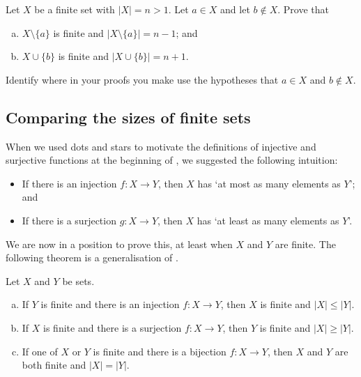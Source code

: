 \begin{exercise}
\label{exAddRemoveElementsOfFiniteSets}
Let $X$ be a finite set with $|X| = n > 1$. Let $a \in X$ and let $b \not \in X$. Prove that
\begin{enumerate}[(a)]
\item $X \setminus \{ a \}$ is finite and $|X \setminus \{ a \}| = n-1$; and
\item $X \cup \{ b \}$ is finite and $|X \cup \{ b \}| = n+1$.
\end{enumerate}
Identify where in your proofs you make use the hypotheses that $a \in X$ and $b \not \in X$.
\end{exercise}

\subsection*{Comparing the sizes of finite sets}

When we used dots and stars to motivate the definitions of injective and surjective functions at the beginning of , we suggested the following intuition:
\begin{itemize} 
\item If there is an injection $f : X \to Y$, then $X$ has `at most as many elements as $Y$'; and
\item If there is a surjection $g : X \to Y$, then $X$ has `at least as many elements as $Y$'.
\end{itemize}

We are now in a position to prove this, at least when $X$ and $Y$ are finite. The following theorem is a generalisation of .

\begin{theorem}
\label{thmFiniteSetsAndJections}
Let $X$ and $Y$ be sets.
\begin{enumerate}[(a)]
\item If $Y$ is finite and there is an injection $f : X \to Y$, then $X$ is finite and $|X| \le |Y|$.
\item If $X$ is finite and there is a surjection $f : X \to Y$, then $Y$ is finite and $|X| \ge |Y|$.
\item If one of $X$ or $Y$ is finite and there is a bijection $f : X \to Y$, then $X$ and $Y$ are both finite and $|X| = |Y|$.
\end{enumerate}
\end{theorem}

